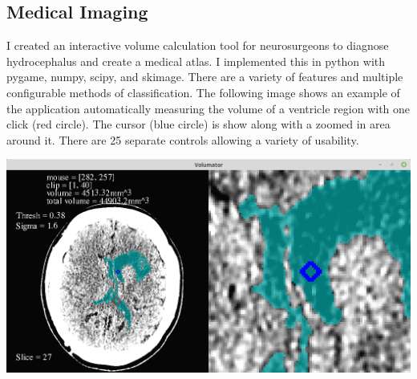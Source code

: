 \documentclass[../resume.tex]{subfiles}
\begin{document}
\begin{figure}[ht]\centering
{}
\end{figure}

\subsection{Medical Imaging}
I created an interactive volume calculation tool for neurosurgeons to diagnose hydrocephalus and create a medical atlas.  I implemented this in python with pygame, numpy, scipy, and skimage.  There are a variety of features and multiple configurable methods of classification.  The following image shows an example of the application automatically measuring the volume of a ventricle region with one click (red circle).  The cursor (blue circle) is show along with a zoomed in area around it.  There are 25 separate controls allowing a variety of usability.

\includegraphics[scale=0.3]{../research/volumator.png} 
\end{document}
